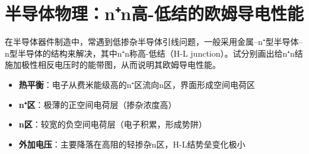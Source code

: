 \section{半导体物理：n⁺n高-低结的欧姆导电性能}
\label{sec:hl-junction-ohmic}

\begin{modelbox}[题目：n⁺n高-低结的欧姆导电特性]
在半导体器件制造中，常遇到低掺杂半导体引线问题，一般采用金属--n⁺型半导体--n型半导体的结构来解决，其中n⁺n称高-低结（H-L junction）。试分别画出给n⁺n结施加极性相反电压时的能带图，从而说明其欧姆导电性能。
\end{modelbox}

\begin{tipbox}[考点快速分析]
\begin{itemize}
    \item \textbf{热平衡}：电子从费米能级高的n⁺区流向n区，界面形成空间电荷区
    \item \textbf{n⁺区}：极薄的正空间电荷层（掺杂浓度高）
    \item \textbf{n区}：较宽的负空间电荷层（电子积累，形成势阱）
    \item \textbf{外加电压}：主要降落在高阻的轻掺杂n区，H-L结势垒变化极小
\end{itemize}
\end{tipbox}

